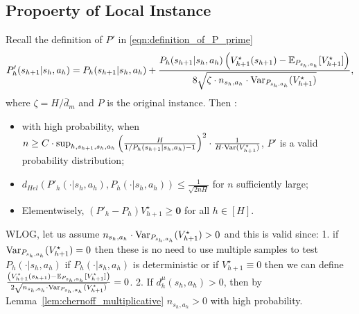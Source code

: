 \subsection{Propoerty of Local Instance}
\begin{lemma}\label{lem:local_instance}
	
Recall the definition of $P'$ in \eqref{eqn:definition_of_P_prime} 
\[
P'_h(s_{h+1}|s_h,a_h)=P_h(s_{h+1}|s_h,a_h)+\frac{P_h(s_{h+1}|s_h,a_h)\left(V_{h+1}^\star(s_{h+1})-\mathbb{E}_{P_{s_h,a_h}}[V_{h+1}^\star]\right)}{8\sqrt{\zeta\cdot n_{s_h,a_h}\cdot \mathrm{Var}_{P_{s_h,a_h}}(V_{h+1}^\star)}},
\]
where $\zeta=  H/\bar{d}_m$ and $P$ is the original instance. Then :
\begin{itemize}
	\item with high probability, when $n\geq C\cdot \sup_{h,s_{h+1},s_h,a_h} \left(\frac{H}{1/P_h(s_{h+1}|s_h,a_h)-1}\right)^2\cdot\frac{1}{H\cdot\mathrm{Var}(V^\star_{h+1})}$, $P'$ is a valid probability distribution; 
	\item $d_{Hel}(P'_h(\cdot|s_h,a_h),P_h(\cdot|s_h,a_h))\leq\frac{1}{\sqrt{2nH}}$ for $n$ sufficiently large;
	\item Elementwisely, $(P'_h-P_h)V^\star_{h+1}\geq \mathbf{0}$ for all $h\in[H]$.
\end{itemize}

\end{lemma}

\begin{remark}\label{remark}
	WLOG, let us assume $n_{s_h,a_h}\cdot \mathrm{Var}_{P_{s_h,a_h}}(V_{h+1}^\star)>0$ and this is valid since: 1. if $\mathrm{Var}_{P_{s_h,a_h}}(V_{h+1}^\star)=0$ then these is no need to use multiple samples to test $P_h(\cdot|s_h,a_h)$ if $P_h(\cdot|s_h,a_h)$ is deterministic or if $V_{h+1}^\star\equiv 0$ then we can define $\frac{\left(V_{h+1}^\star(s_{h+1})-\mathbb{E}_{P_{s_h,a_h}}[V_{h+1}^\star]\right)}{2\sqrt{n_{s_h,a_h}\cdot \mathrm{Var}_{P_{s_h,a_h}}(V_{h+1}^\star)}}=0$. 2. If $d^\mu_h(s_h,a_h)>0$, then by Lemma~\ref{lem:chernoff_multiplicative} $n_{s_h,a_h}>0$ with high probability.
\end{remark}

